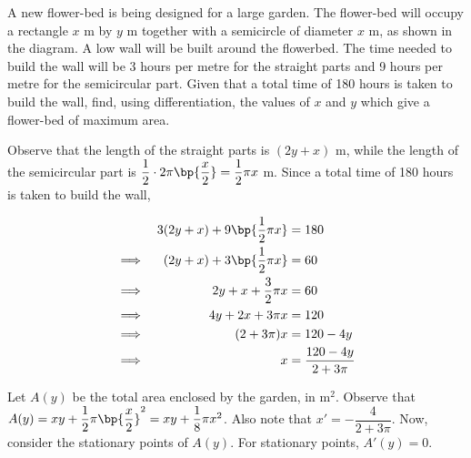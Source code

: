 \documentclass{echw}
\begin{document}
    \problem{}
        \begin{center}
        \end{center}
        
         A new flower-bed is being designed for a large garden. The flower-bed will occupy a rectangle $x$ m by $y$ m together with a semicircle of diameter $x$ m, as shown in the diagram. A low wall will be built around the flowerbed. The time needed to build the wall will be 3 hours per metre for the straight parts and 9 hours per metre for the semicircular part. Given that a total time of 180 hours is taken to build the wall, find, using differentiation, the values of $x$ and $y$ which give a flower-bed of maximum area.

    \solution
        Observe that the length of the straight parts is $(2y + x)$ m, while the length of the semicircular part is $\dfrac12 \cdot 2\pi\bp{\dfrac{x}2} = \dfrac12 \pi x$ m. Since a total time of 180 hours is taken to build the wall,

        \begin{alignat*}{2}
            &&3 (2y + x) + 9\bp{\dfrac12 \pi x} &= 180\\
            \implies&& (2y + x) + 3\bp{\dfrac12 \pi x} &= 60\\
            \implies&&2y + x + \dfrac32 \pi x &= 60\\
            \implies&&4y + 2x + 3\pi x &= 120\\
            \implies&&(2 + 3\pi)x &= 120-4y\\
            \implies&& x &= \dfrac{120-4y}{2+3\pi}
        \end{alignat*}

        Let $A(y)$ be the total area enclosed by the garden, in m$^2$. Observe that $A(y) = xy + \dfrac12 \pi \bp{\dfrac{x}2}^2 = xy + \dfrac18 \pi x^2$. Also note that $x' = -\dfrac4{2 + 3\pi}$. Now, consider the stationary points of $A(y)$. For stationary points, $A'(y) = 0$.
\end{document}
